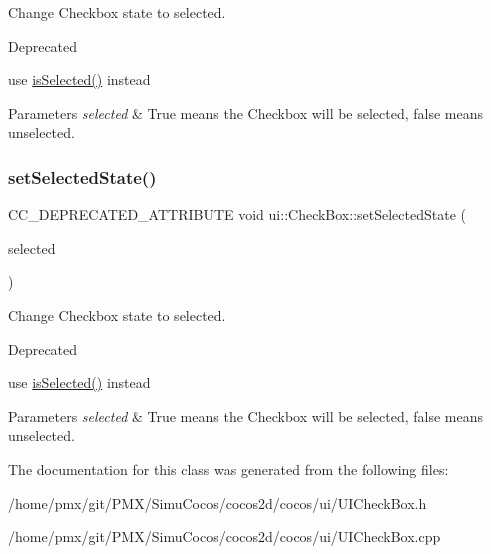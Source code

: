 Change Checkbox state to selected.

\begin{DoxyRefDesc}{Deprecated}
\item[\hyperlink{deprecated__deprecated000139}{Deprecated}]use {\ttfamily \hyperlink{classui_1_1AbstractCheckButton_ade8bb264515600c46a81947344f4a53b}{is\+Selected()}} instead \end{DoxyRefDesc}

\begin{DoxyParams}{Parameters}
{\em selected} & True means the Checkbox will be selected, false means unselected. \\
\hline
\end{DoxyParams}
\mbox{\label{classui_1_1CheckBox_a44e1b53dcbc7ac25e41b72e2e4487775}} 
\subsubsection{\texorpdfstring{set\+Selected\+State()}{setSelectedState()}\hspace{0.1cm}{\footnotesize\ttfamily [2/2]}}
{\footnotesize\ttfamily C\+C\+\_\+\+D\+E\+P\+R\+E\+C\+A\+T\+E\+D\+\_\+\+A\+T\+T\+R\+I\+B\+U\+TE void ui\+::\+Check\+Box\+::set\+Selected\+State (\begin{DoxyParamCaption}\item[{bool}]{selected }\end{DoxyParamCaption})\hspace{0.3cm}{\ttfamily [inline]}}

Change Checkbox state to selected.

\begin{DoxyRefDesc}{Deprecated}
\item[\hyperlink{deprecated__deprecated000372}{Deprecated}]use {\ttfamily \hyperlink{classui_1_1AbstractCheckButton_ade8bb264515600c46a81947344f4a53b}{is\+Selected()}} instead \end{DoxyRefDesc}

\begin{DoxyParams}{Parameters}
{\em selected} & True means the Checkbox will be selected, false means unselected. \\
\hline
\end{DoxyParams}


The documentation for this class was generated from the following files\+:\begin{DoxyCompactItemize}
\item 
/home/pmx/git/\+P\+M\+X/\+Simu\+Cocos/cocos2d/cocos/ui/U\+I\+Check\+Box.\+h\item 
/home/pmx/git/\+P\+M\+X/\+Simu\+Cocos/cocos2d/cocos/ui/U\+I\+Check\+Box.\+cpp\end{DoxyCompactItemize}
